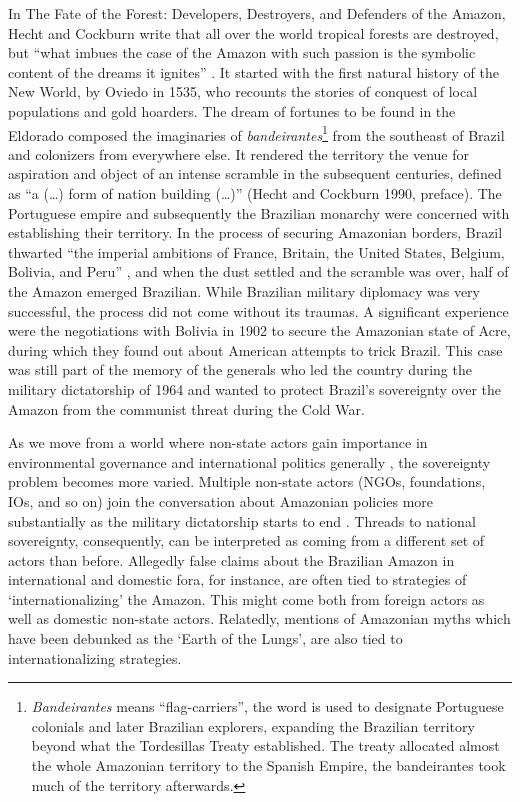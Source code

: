 \documentclass[]{interact}
\theoremstyle{plain}%
\theoremstyle{definition}
\theoremstyle{remark}
\begin{document}
In The Fate of the Forest: Developers, Destroyers, and Defenders of the
Amazon, Hecht and Cockburn write that all over the world tropical
forests are destroyed, but ``what imbues the case of the Amazon with
such passion is the symbolic content of the dreams it ignites''
\citeyearpar[pp.1]{hecht1990}. It started with the first natural history
of the New World, by Oviedo in 1535, who recounts the stories of
conquest of local populations and gold hoarders. The dream of fortunes
to be found in the Eldorado composed the imaginaries of
\emph{bandeirantes}\footnote{\emph{Bandeirantes} means
  ``flag-carriers'', the word is used to designate Portuguese colonials
  and later Brazilian explorers, expanding the Brazilian territory
  beyond what the Tordesillas Treaty established. The treaty allocated
  almost the whole Amazonian territory to the Spanish Empire, the
  bandeirantes took much of the territory afterwards.} from the
southeast of Brazil and colonizers from everywhere else. It rendered the
territory the venue for aspiration and object of an intense scramble in
the subsequent centuries, defined as ``a (\ldots) form of nation
building (\ldots)'' (Hecht and Cockburn 1990, preface). The Portuguese
empire and subsequently the Brazilian monarchy were concerned with
establishing their territory. In the process of securing Amazonian
borders, Brazil thwarted ``the imperial ambitions of France, Britain,
the United States, Belgium, Bolivia, and Peru'' \citep[pp.8]{hecht2013},
and when the dust settled and the scramble was over, half of the Amazon
emerged Brazilian. While Brazilian military diplomacy was very
successful, the process did not come without its traumas. A significant
experience were the negotiations with Bolivia in 1902 to secure the
Amazonian state of Acre, during which they found out about American
attempts to trick Brazil\citep{hecht1990}. This case was still part of
the memory of the generals who led the country during the military
dictatorship of 1964 and wanted to protect Brazil's sovereignty over the
Amazon from the communist threat during the Cold
War\citep{garfield2013}.

As we move from a world where non-state actors gain importance in
environmental governance and international politics generally
\citep{silva-muller2022, andonova2014, westerwinter2021}, the
sovereignty problem becomes more varied. Multiple non-state actors
(NGOs, foundations, IOs, and so on) join the conversation about
Amazonian policies more substantially as the military dictatorship
starts to end \citep{hochstetler2021, capobianco2019, franchini2019}.
Threads to national sovereignty, consequently, can be interpreted as
coming from a different set of actors than before. Allegedly false
claims about the Brazilian Amazon in international and domestic fora,
for instance, are often tied to strategies of `internationalizing' the
Amazon. This might come both from foreign actors as well as domestic
non-state actors. Relatedly, mentions of Amazonian myths which have been
debunked as the `Earth of the Lungs', are also tied to
internationalizing strategies.
\end{document}
